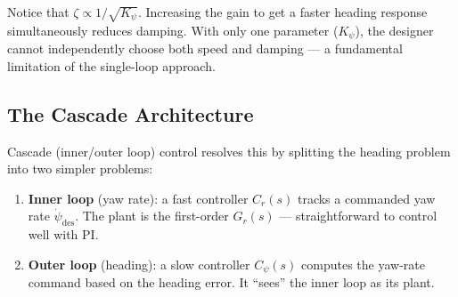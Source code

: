 \documentclass[12pt]{article}
\begin{document}
Notice that $\zeta \propto 1/\sqrt{K_\psi}$.  Increasing the gain to get a
faster heading response simultaneously reduces damping.  With only one
parameter ($K_\psi$), the designer cannot independently choose both speed and
damping --- a fundamental limitation of the single-loop approach.

\subsection{The Cascade Architecture}

Cascade (inner/outer loop) control resolves this by splitting the heading
problem into two simpler problems:

\begin{enumerate}
  \item \textbf{Inner loop} (yaw rate): a fast controller $C_r(s)$ tracks a
    commanded yaw rate $\dot\psi_\mathrm{des}$.  The plant is the first-order
    $G_r(s)$ --- straightforward to control well with PI.
  \item \textbf{Outer loop} (heading): a slow controller $C_\psi(s)$
    computes the yaw-rate command based on the heading error.  It ``sees''
    the inner loop as its plant.
\end{enumerate}
\end{document}

